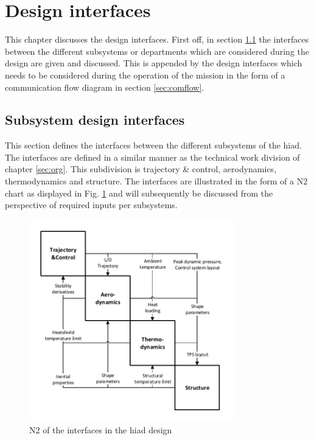 \section{Design interfaces} \label{ch:di}

This chapter discusses the design interfaces. First off, in section \ref{sec:N2} the interfaces between the different subsystems or departments which are considered during the design are given and discussed. This is appended by the design interfaces which needs to be considered during the operation of the mission in the form of a communication flow diagram in section \ref{sec:comflow}.

\subsection{Subsystem design interfaces} \label{sec:N2}
This section defines the interfaces between the different subsystems of the \gls{hiad}. The interfaces are defined in a similar manner as the technical work division of chapter \ref{sec:org}. This subdivision is trajectory \& control, aerodynamics, thermodynamics and structure.  The interfaces are illustrated in the form of a N2 chart as displayed in Fig. \ref{fig:N2} and will subsequently be discussed from the perspective of required inputs per subsystems.

\begin{figure}[H]
\centering
\includegraphics[width = 0.8\textwidth]{Figure/N2.pdf}
\caption{N2 of the interfaces in the \gls{hiad} design}
\label{fig:N2}
\end{figure}

